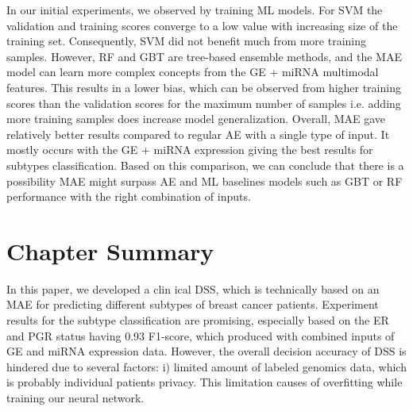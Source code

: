 \hspace*{3.5mm} In our initial experiments, we observed by training ML models. For SVM the validation and training scores converge to a low value with increasing size of the training set. Consequently, SVM did not benefit much from more training samples. However, RF and GBT are tree-based ensemble methods, and the MAE model can learn more complex concepts from the GE + miRNA multimodal features. This results in a lower bias, which can be observed from higher training scores than the validation scores for the maximum number of samples i.e. adding more training samples does increase model generalization. Overall, MAE gave relatively better results compared to regular AE with a single type of input.
It mostly occurs with the GE + miRNA expression giving the best results for subtypes classification.
Based on this comparison, we can conclude that there is a possibility MAE might surpass AE and ML baselines models such as GBT or RF performance with the right combination of inputs. 

\section{Chapter Summary}\label{chapter_4:conclusion}
In this paper, we developed a clin ical DSS, which is technically based on an MAE for predicting different subtypes of breast cancer patients.
Experiment results for the subtype classification are promising, especially based on the ER and PGR status having 0.93 F1-score, which produced with combined inputs of GE and miRNA expression data. 
However, the overall decision accuracy of DSS is hindered due to several factors: i) limited amount of labeled genomics data, which is probably individual patients privacy. This limitation causes of overfitting while training our neural network. 

